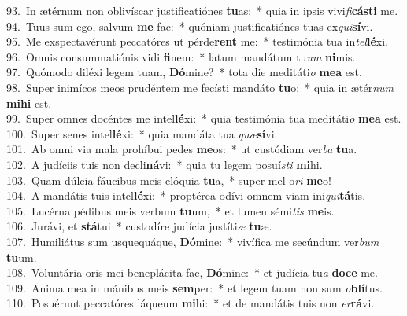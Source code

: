 {93.~}In ætérnum non oblivíscar justificatiónes \textbf{tu}as:~* quia in ipsis vivi\textit{fi}\textbf{cá}\textbf{sti} me.\\
{94.~}Tuus sum ego, salvum \textbf{me} fac:~* quóniam justificatiónes tuas ex\textit{qui}\textbf{sí}vi.\\
{95.~}Me exspectavérunt peccatóres ut pérde\textbf{rent} me:~* testimónia tua in\textit{tel}\textbf{lé}xi.\\
{96.~}Omnis consummatiónis vidi \textbf{fi}nem:~* latum mandátum tu\textit{um} \textbf{ni}mis.\\
{97.~}Quómodo diléxi legem tuam, \textbf{Dó}mine?~* tota die meditáti\textit{o} \textbf{me}\textbf{a} est.\\
{98.~}Super inimícos meos prudéntem me fecísti mandáto \textbf{tu}o:~* quia in ætér\textit{num} \textbf{mi}\textbf{hi} est.\\
{99.~}Super omnes docéntes me intel\textbf{lé}xi:~* quia testimónia tua meditáti\textit{o} \textbf{me}\textbf{a} est.\\
{100.~}Super senes intel\textbf{lé}xi:~* quia mandáta tua \textit{quæ}\textbf{sí}vi.\\
{101.~}Ab omni via mala prohíbui pedes \textbf{me}os:~* ut custódiam ver\textit{ba} \textbf{tu}a.\\
{102.~}A judíciis tuis non decli\textbf{ná}vi:~* quia tu legem posuí\textit{sti} \textbf{mi}hi.\\
{103.~}Quam dúlcia fáucibus meis elóquia \textbf{tu}a,~* super mel o\textit{ri} \textbf{me}o!\\
{104.~}A mandátis tuis intel\textbf{lé}xi:~* proptérea odívi omnem viam ini\textit{qui}\textbf{tá}tis.\\
{105.~}Lucérna pédibus meis verbum \textbf{tu}um,~* et lumen sémi\textit{tis} \textbf{me}is.\\
{106.~}Jurávi, et \textbf{stá}tui~* custodíre judícia justíti\textit{æ} \textbf{tu}æ.\\
{107.~}Humiliátus sum usquequáque, \textbf{Dó}mine:~* vivífica me secúndum ver\textit{bum} \textbf{tu}um.\\
{108.~}Voluntária oris mei beneplácita fac, \textbf{Dó}mine:~* et judícia tu\textit{a} \textbf{do}\textbf{ce} me.\\
{109.~}Anima mea in mánibus meis \textbf{sem}per:~* et legem tuam non sum \textit{o}\textbf{blí}tus.\\
{110.~}Posuérunt peccatóres láqueum \textbf{mi}hi:~* et de mandátis tuis non \textit{er}\textbf{rá}vi.\\
